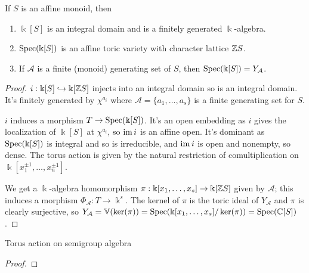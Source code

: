 \begin{proposition}
  \label{prop:1.1.14}
  If $S$ is an affine monoid, then
  \begin{enumerate}
    \item $\Bbbk[S]$ is an integral domain and is a finitely generated $\Bbbk$-algebra.
    \item $\operatorname{Spec}(\Bbbk[S])$ is an affine toric variety with character lattice ${\mathbb Z} S$.
    \item If $\mathcal A$ is a finite (monoid) generating set of $S$, then $\operatorname{Spec}(\Bbbk[S]) = Y_{\mathcal A}$.
  \end{enumerate}
\end{proposition}
\begin{proof}
  $i : \Bbbk[S] \hookrightarrow \Bbbk[{\mathbb Z} S]$ injects into an integral domain so is an integral domain. It's finitely generated by $\chi^{a_i}$ where $\mathcal A = \{a_1, \dotsc, a_s\}$ is a finite generating set for $S$.

  $i$ induces a morphism $T \to \operatorname{Spec}(\Bbbk[S])$. It's an open embedding as $i$ gives the localization of $\Bbbk[S]$ at $\chi^{a_i}$, so $\operatorname{im} i$ is an affine open. It's dominant as $\operatorname{Spec}(\Bbbk[S])$ is integral and so is irreducible, and $\operatorname{im} i$ is open and nonempty, so dense. The torus action is given by the natural restriction of comultiplication on $\Bbbk[x_1^{\pm1}, \dotsc, x_n^{\pm1}]$.

  We get a $\Bbbk$-algebra homomorphism $\pi : \Bbbk[x_1, \dotsc, x_s] \to \Bbbk[{\mathbb Z} S]$ given by $\mathcal A$; this induces a morphism $\Phi_{\mathcal A} : T \to \Bbbk^s$. The kernel of $\pi$ is the toric ideal of $Y_{\mathcal A}$ and $\pi$ is clearly surjective, so $Y_{\mathcal A} = \mathbb V(\ker(\pi)) = \operatorname{Spec}(\Bbbk[x_1, \dotsc, x_s] / \ker(\pi)) = \operatorname{Spec}({\mathbb C}[S])$.
\end{proof}

\begin{definition}
  \label{torActOnAlg}
  Torus action on semigroup algebra
\end{definition}

\begin{lemma}
  \label{lmm:1.1.16}
\end{lemma}
\begin{proof}
\end{proof}

